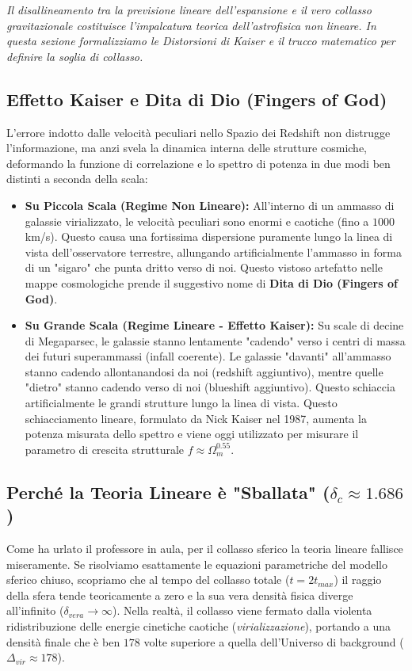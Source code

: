 \documentclass[11pt,a4paper]{report}
\begin{document}
\textit{Il disallineamento tra la previsione lineare dell'espansione e il vero collasso gravitazionale costituisce l'impalcatura teorica dell'astrofisica non lineare. In questa sezione formalizziamo le Distorsioni di Kaiser e il trucco matematico per definire la soglia di collasso.}

\subsection{Effetto Kaiser e Dita di Dio (Fingers of God)}
L'errore indotto dalle velocità peculiari nello Spazio dei Redshift non distrugge l'informazione, ma anzi svela la dinamica interna delle strutture cosmiche, deformando la funzione di correlazione e lo spettro di potenza in due modi ben distinti a seconda della scala:
\begin{itemize}
    \item \textbf{Su Piccola Scala (Regime Non Lineare):} All'interno di un ammasso di galassie virializzato, le velocità peculiari sono enormi e caotiche (fino a $1000$ km/s). Questo causa una fortissima dispersione puramente lungo la linea di vista dell'osservatore terrestre, allungando artificialmente l'ammasso in forma di un "sigaro" che punta dritto verso di noi. Questo vistoso artefatto nelle mappe cosmologiche prende il suggestivo nome di \textbf{Dita di Dio (Fingers of God)}.
    \item \textbf{Su Grande Scala (Regime Lineare - Effetto Kaiser):} Su scale di decine di Megaparsec, le galassie stanno lentamente "cadendo" verso i centri di massa dei futuri superammassi (infall coerente). Le galassie "davanti" all'ammasso stanno cadendo allontanandosi da noi (redshift aggiuntivo), mentre quelle "dietro" stanno cadendo verso di noi (blueshift aggiuntivo). Questo schiaccia artificialmente le grandi strutture lungo la linea di vista. Questo schiacciamento lineare, formulato da Nick Kaiser nel 1987, aumenta la potenza misurata dello spettro e viene oggi utilizzato per misurare il parametro di crescita strutturale $f \approx \Omega_m^{0.55}$.
\end{itemize}

\subsection{Perché la Teoria Lineare è "Sballata" ($\delta_c \approx 1.686$)}
Come ha urlato il professore in aula, per il collasso sferico la teoria lineare fallisce miseramente. Se risolviamo esattamente le equazioni parametriche del modello sferico chiuso, scopriamo che al tempo del collasso totale ($t = 2t_{max}$) il raggio della sfera tende teoricamente a zero e la sua vera densità fisica diverge all'infinito ($\delta_{vera} \to \infty$). Nella realtà, il collasso viene fermato dalla violenta ridistribuzione delle energie cinetiche caotiche (\textit{virializzazione}), portando a una densità finale che è ben $178$ volte superiore a quella dell'Universo di background ($\Delta_{vir} \approx 178$).
\end{document}
